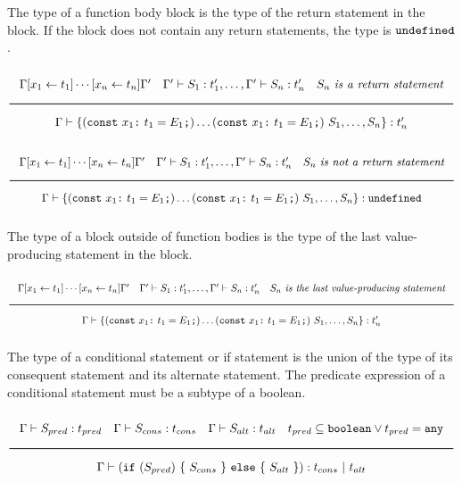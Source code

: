 The type of a function body block is the type of the return statement in the block.
If the block does not contain any return statements, the type is $\texttt{undefined}$.

\noindent
\[
  \Rule{\Gamma [x_1 \leftarrow t_1] \cdots [x_n \leftarrow t_n] \Gamma' \quad
    \Gamma' \vdash S_1 : t'_1, \ldots, \Gamma' \vdash S_n : t'_n \quad S_n\ \textit{is a return statement}}{
    \Gamma \vdash \{ (\texttt{const}\ x_1 \texttt{:}\ t_1 = E_1\texttt{;}) \ldots (\texttt{const}\ x_1 \texttt{:}\ t_1 = E_1\texttt{;})\
    S_1, \ldots, S_n\} : t'_n}
\]
\noindent
\[
  \Rule{\Gamma [x_1 \leftarrow t_1] \cdots [x_n \leftarrow t_n] \Gamma' \quad
    \Gamma' \vdash S_1 : t'_1, \ldots, \Gamma' \vdash S_n : t'_n \quad S_n\ \textit{is not a return statement}}{
    \Gamma \vdash \{ (\texttt{const}\ x_1 \texttt{:}\ t_1 = E_1\texttt{;}) \ldots (\texttt{const}\ x_1 \texttt{:}\ t_1 = E_1\texttt{;})\
    S_1, \ldots, S_n\} : \Undefined}
\]
\noindent

The type of a block outside of function bodies is the type of the last value-producing statement in the block.

\noindent
\[
  \Rule{\Gamma [x_1 \leftarrow t_1] \cdots [x_n \leftarrow t_n] \Gamma' \quad
    \Gamma' \vdash S_1 : t'_1, \ldots, \Gamma' \vdash S_n : t'_n \quad S_n\ \textit{is the last value-producing statement}}{
    \Gamma \vdash \{ (\texttt{const}\ x_1 \texttt{:}\ t_1 = E_1\texttt{;}) \ldots (\texttt{const}\ x_1 \texttt{:}\ t_1 = E_1\texttt{;})\
    S_1, \ldots, S_n\} : t'_n}
\]
\noindent

The type of a conditional statement or if statement is the union of the type of its consequent statement and its alternate statement.
The predicate expression of a conditional statement must be a subtype of a boolean.

\noindent
\[
  \Rule{\Gamma \vdash S_{pred} : t_{pred} \quad \Gamma \vdash S_{cons} : t_{cons} \quad \Gamma \vdash S_{alt} : t_{alt}
    \quad t_{pred} \subseteq \Bool \vee t_{pred} = \Any}{\Gamma \vdash (\texttt{if}\ (S_{pred})\ \{\ S_{cons}\ \}\
    \texttt{else}\ \{\ S_{alt}\ \}) : t_{cons}\ |\ t_{alt}}
\]
\noindent
